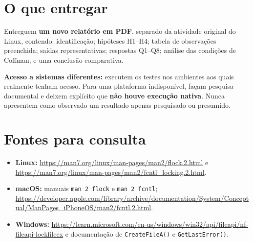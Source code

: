 \documentclass[11pt,a4paper]{article}
\begin{document}
\section{O que entregar}
Entreguem \textbf{um novo relatório em PDF}, separado da atividade original do Linux, contendo: identificação; hipóteses H1--H4; tabela de observações preenchida; saídas representativas; respostas Q1--Q8; análise das condições de Coffman; e uma conclusão comparativa.

\textbf{Acesso a sistemas diferentes:} executem os testes nos ambientes aos quais realmente tenham acesso. Para uma plataforma indisponível, façam pesquisa documental e deixem explícito que \textbf{não houve execução nativa}. Nunca apresentem como observado um resultado apenas pesquisado ou presumido.

\section{Fontes para consulta}
\begin{itemize}
\item \textbf{Linux:} \url{https://man7.org/linux/man-pages/man2/flock.2.html} e \url{https://man7.org/linux/man-pages/man2/fcntl_locking.2.html}.
\item \textbf{macOS:} manuais \texttt{man 2 flock} e \texttt{man 2 fcntl}; \url{https://developer.apple.com/library/archive/documentation/System/Conceptual/ManPages_iPhoneOS/man2/fcntl.2.html}.
\item \textbf{Windows:} \url{https://learn.microsoft.com/en-us/windows/win32/api/fileapi/nf-fileapi-lockfileex} e documentação de \texttt{CreateFileA()} e \texttt{GetLastError()}.
\end{itemize}
\end{document}
